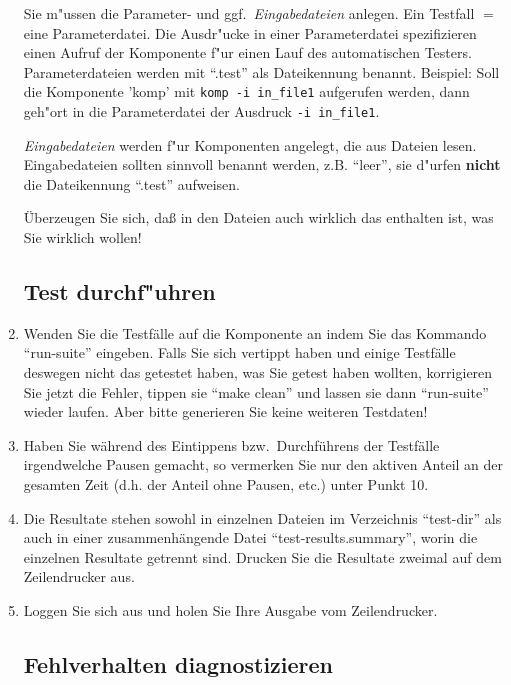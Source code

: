 \begin{enumerate}
Sie m"ussen die Parameter- und ggf.~{\em Eingabedateien} anlegen. Ein 
Testfall $=$ eine Parameterdatei. Die 
Ausdr"ucke in einer Parameterdatei spezifizieren einen Aufruf der
Komponente f"ur einen Lauf des automatischen Testers. Parameterdateien werden
mit ``.test'' als Dateikennung benannt. Beispiel: Soll die Komponente 'komp'
mit {\tt komp -i in\_file1} aufgerufen werden, dann geh"ort in
die Parameterdatei der Ausdruck {\tt -i in\_file1}.

{\em Eingabedateien\/} werden f"ur Komponenten angelegt, die aus
Dateien lesen. Eingabedateien sollten sinnvoll benannt werden,
z.B. ``leer'', sie d"urfen {\bf nicht} die Dateikennung ``.test'' aufweisen.

\"Uberzeugen Sie sich, da{\ss} in den Dateien auch wirklich das
enthalten ist, was Sie wirklich wollen!

\subsection*{Test durchf"uhren}

\item Wenden Sie die Testf\"alle auf die Komponente an indem Sie das
Kommando "`run-suite"' eingeben. 
Falls Sie sich vertippt haben und einige Testf\"alle deswegen
nicht das getestet haben, was Sie getest haben wollten, korrigieren
Sie jetzt die Fehler, tippen sie "`make clean"' und lassen sie
dann "`run-suite"' wieder laufen.   
Aber bitte generieren Sie keine weiteren Testdaten! 

\item Haben Sie w\"ahrend des Eintippens bzw.~Durchf\"uhrens der
Testf\"alle irgendwelche Pausen gemacht, so vermerken Sie nur den aktiven
Anteil an der gesamten Zeit (d.h. der Anteil ohne Pausen, etc.) unter
Punkt 10. 

\item Die Resultate stehen sowohl in einzelnen Dateien im Verzeichnis 
"`test-dir"' als auch in einer zusammenh\"angende Datei
"`test-results.summary"', worin die einzelnen Resultate getrennt sind.
Drucken Sie die Resultate zweimal auf dem Zeilendrucker aus. 

\item Loggen Sie sich aus und holen Sie Ihre Ausgabe vom Zeilendrucker.

\subsection*{Fehlverhalten diagnostizieren}


\end{enumerate}
